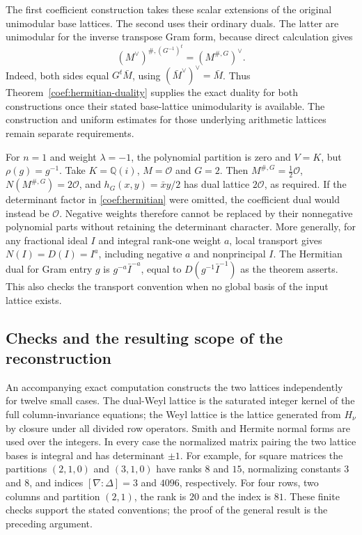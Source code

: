The first coefficient construction takes these scalar extensions of
the original unimodular base lattices. The second uses their ordinary
duals. The latter are unimodular for the inverse
transpose Gram form, because direct calculation gives
\[
 (M^\vee)^{\#,(G^{-1})^t}=(M^{\#,G})^\vee.
\]
Indeed, both sides equal $G^t\bar M$, using
$(\bar M^\vee)^\vee=\bar M$.
Thus Theorem~\ref{coef:hermitian-duality} supplies the exact duality
for both constructions once their stated base-lattice unimodularity is
available. The construction and uniform estimates for those underlying
arithmetic lattices remain separate requirements.

\begin{example}
For $n=1$ and weight $\lambda=-1$, the polynomial partition is zero
and $V=K$, but $\rho(g)=g^{-1}$.
Take $K=\mathbb Q(i)$, $M=\mathcal O$ and $G=2$.
Then $M^{\#,G}=\tfrac12\mathcal O$,
$N(M^{\#,G})=2\mathcal O$, and
$h_G(x,y)=\bar x y/2$ has dual lattice $2\mathcal O$, as required.
If the determinant factor in \eqref{coef:hermitian} were omitted,
the coefficient dual would instead be $\mathcal O$.
Negative weights therefore cannot be replaced by their nonnegative
polynomial parts without retaining the determinant character.
More generally, for any fractional ideal $I$ and integral rank-one
weight $a$, local transport gives $N(I)=D(I)=I^a$, including negative
$a$ and nonprincipal $I$. The Hermitian dual for Gram entry $g$ is
$g^{-a}\bar I^{-a}$, equal to $D(g^{-1}\bar I^{-1})$ as the theorem
asserts. This also checks the transport convention when no global
basis of the input lattice exists.
\end{example}

\subsection{Checks and the resulting scope of the reconstruction}

An accompanying exact computation constructs the two lattices
independently for twelve small cases. The dual-Weyl lattice is the
saturated integer kernel of the full column-invariance equations;
the Weyl lattice is the lattice generated from $H_\nu$ by closure
under all divided row operators. Smith and Hermite normal forms are
used over the integers. In every case the normalized matrix pairing
the two lattice bases is integral and has determinant $\pm1$.
For example, for square matrices the partitions $(2,1,0)$ and
$(3,1,0)$ have ranks $8$ and $15$, normalizing constants $3$ and $8$,
and indices $[\nabla:\Delta]=3$ and $4096$, respectively.
For four rows, two columns and partition $(2,1)$, the rank is $20$
and the index is $81$. These finite checks support the stated
conventions; the proof of the general result is the preceding argument.


